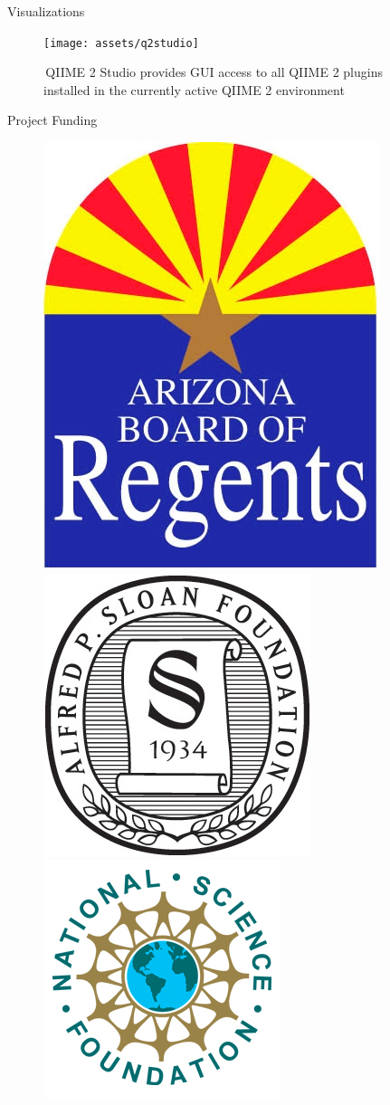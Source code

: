 \documentclass[final]{beamer}
\newlength{\colwidth}
\begin{document}
\begin{frame}[t]
\begin{columns}[t]
\begin{column}{\colwidth}
\begin{block}{Visualizations}
    \begin{figure}[tph!]
      {\texttt{[image: assets/q2studio]}}
      \caption{\,QIIME 2 Studio provides GUI access to all QIIME 2 plugins installed in the currently active QIIME 2 environment}
      \label{fig:q2studio}
      \end{figure}
  \end{block}

  \begin{block}{Project Funding}
      \begin{figure}[!htb]
          \begin{center}
            \includegraphics[width=.35\linewidth]{assets/SponsorLogos/ABOR}
          \end{center}
        \endminipage
        \hskip 2cm
          \begin{center}
            \includegraphics[width=.42\linewidth]{assets/SponsorLogos/APSloanFdn}
          \end{center}
        \endminipage\hfill
          \begin{center}
            \includegraphics[width=.50\linewidth]{assets/SponsorLogos/NSF}

\end{center}
\end{figure}
\end{block}
\end{column}
\end{columns}
\end{frame}
\end{document}
